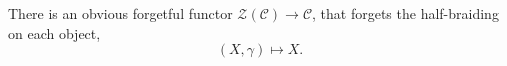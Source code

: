 \documentclass[a4paper, 10pt]{book}
\theoremstyle{definition}
\numberwithin{equation}{chapter}
\newcommand\inv{^{-1}}
\newcommand\id{\operatorname{id}}
\newcommand\C{\mathcal C}
\newcommand\CTR{\mathcal Z}
\newcommand\ev{\operatorname{ev}}
\newcommand\coev{\operatorname{coev}}
\begin{document}

There is an obvious forgetful functor $\CTR(\C)\rightarrow \C$, that forgets the half-braiding on each object,
\begin{equation}
	(X, \gamma)\mapsto X.
\end{equation}
\end{document}
